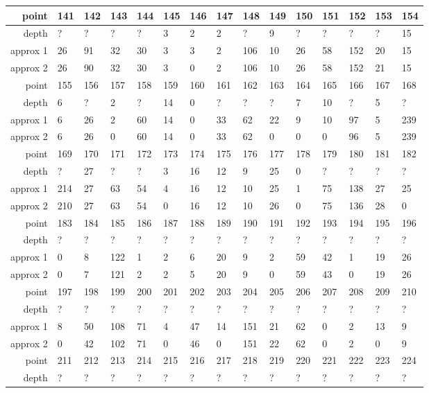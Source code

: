 \begin{center}
\begin{supertabular}{|r|l l l l l l l l l l l l l l|}
\hline
point & 141 & 142 & 143 & 144 & 145 & 146 & 147 & 148 & 149 & 150 & 151 & 152 & 153 & 154 \\
\hline
depth & ? & ? & ? & ? & 3 & 2 & 2 & ? & 9 & ? & ? & ? & ? & 15 \\
approx 1 & 26 & 91 & 32 & 30 & 3 & 3 & 2 & 106 & 10 & 26 & 58 & 152 & 20 & 15 \\
approx 2 & 26 & 90 & 32 & 30 & 3 & 0 & 2 & 106 & 10 & 26 & 58 & 152 & 21 & 15 \\
\hline
point & 155 & 156 & 157 & 158 & 159 & 160 & 161 & 162 & 163 & 164 & 165 & 166 & 167 & 168 \\
\hline
depth & 6 & ? & 2 & ? & 14 & 0 & ? & ? & ? & 7 & 10 & ? & 5 & ? \\
approx 1 & 6 & 26 & 2 & 60 & 14 & 0 & 33 & 62 & 22 & 9 & 10 & 97 & 5 & 239 \\
approx 2 & 6 & 26 & 0 & 60 & 14 & 0 & 33 & 62 & 0 & 0 & 0 & 96 & 5 & 239 \\
\hline
point & 169 & 170 & 171 & 172 & 173 & 174 & 175 & 176 & 177 & 178 & 179 & 180 & 181 & 182 \\
\hline
depth & ? & 27 & ? & ? & 3 & 16 & 12 & 9 & 25 & 0 & ? & ? & ? & ? \\
approx 1 & 214 & 27 & 63 & 54 & 4 & 16 & 12 & 10 & 25 & 1 & 75 & 138 & 27 & 25 \\
approx 2 & 210 & 27 & 63 & 54 & 0 & 16 & 12 & 10 & 26 & 0 & 75 & 136 & 28 & 0 \\
\hline
point & 183 & 184 & 185 & 186 & 187 & 188 & 189 & 190 & 191 & 192 & 193 & 194 & 195 & 196 \\
\hline
depth & ? & ? & ? & ? & ? & ? & ? & ? & ? & ? & ? & ? & ? & ? \\
approx 1 & 0 & 8 & 122 & 1 & 2 & 6 & 20 & 9 & 2 & 59 & 42 & 1 & 19 & 26 \\
approx 2 & 0 & 7 & 121 & 2 & 2 & 5 & 20 & 9 & 0 & 59 & 43 & 0 & 19 & 26 \\
\hline
point & 197 & 198 & 199 & 200 & 201 & 202 & 203 & 204 & 205 & 206 & 207 & 208 & 209 & 210 \\
\hline
depth & ? & ? & ? & ? & ? & ? & ? & ? & ? & ? & ? & ? & ? & ? \\
approx 1 & 8 & 50 & 108 & 71 & 4 & 47 & 14 & 151 & 21 & 62 & 0 & 2 & 13 & 9 \\
approx 2 & 0 & 42 & 102 & 71 & 0 & 46 & 0 & 151 & 22 & 62 & 0 & 2 & 0 & 9 \\
\hline
point & 211 & 212 & 213 & 214 & 215 & 216 & 217 & 218 & 219 & 220 & 221 & 222 & 223 & 224 \\
\hline
depth & ? & ? & ? & ? & ? & ? & ? & ? & ? & ? & ? & ? & ? & ? \\

\end{supertabular}
\end{center}
